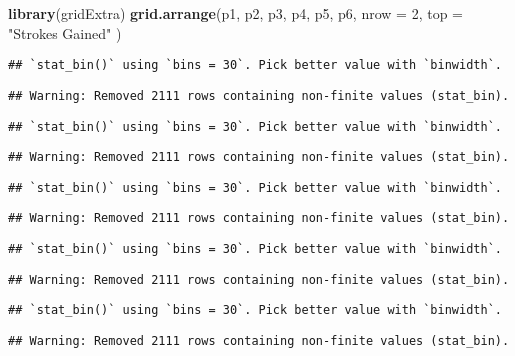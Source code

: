 \documentclass[
]{article}
\newenvironment{Shaded}{\begin{snugshade}}{\end{snugshade}}
\newcommand{\DataTypeTok}[1]{\textcolor[rgb]{0.13,0.29,0.53}{#1}}
\newcommand{\DecValTok}[1]{\textcolor[rgb]{0.00,0.00,0.81}{#1}}
\newcommand{\KeywordTok}[1]{\textcolor[rgb]{0.13,0.29,0.53}{\textbf{#1}}}
\newcommand{\NormalTok}[1]{#1}
\newcommand{\StringTok}[1]{\textcolor[rgb]{0.31,0.60,0.02}{#1}}
\begin{document}
\begin{Shaded}
\begin{Highlighting}[]
\KeywordTok{library}\NormalTok{(gridExtra)}
\KeywordTok{grid.arrange}\NormalTok{(p1, p2, p3, p4, p5, p6, }\DataTypeTok{nrow =} \DecValTok{2}\NormalTok{,}
             \DataTypeTok{top =} \StringTok{"Strokes Gained"}
\NormalTok{)}
\end{Highlighting}
\end{Shaded}

\begin{verbatim}
## `stat_bin()` using `bins = 30`. Pick better value with `binwidth`.
\end{verbatim}

\begin{verbatim}
## Warning: Removed 2111 rows containing non-finite values (stat_bin).
\end{verbatim}

\begin{verbatim}
## `stat_bin()` using `bins = 30`. Pick better value with `binwidth`.
\end{verbatim}

\begin{verbatim}
## Warning: Removed 2111 rows containing non-finite values (stat_bin).
\end{verbatim}

\begin{verbatim}
## `stat_bin()` using `bins = 30`. Pick better value with `binwidth`.
\end{verbatim}

\begin{verbatim}
## Warning: Removed 2111 rows containing non-finite values (stat_bin).
\end{verbatim}

\begin{verbatim}
## `stat_bin()` using `bins = 30`. Pick better value with `binwidth`.
\end{verbatim}

\begin{verbatim}
## Warning: Removed 2111 rows containing non-finite values (stat_bin).
\end{verbatim}

\begin{verbatim}
## `stat_bin()` using `bins = 30`. Pick better value with `binwidth`.
\end{verbatim}

\begin{verbatim}
## Warning: Removed 2111 rows containing non-finite values (stat_bin).
\end{verbatim}
\end{document}
